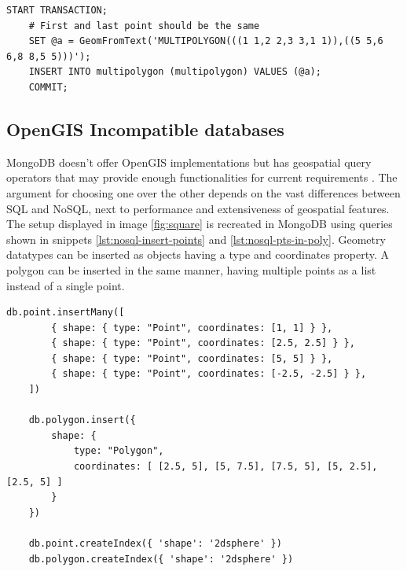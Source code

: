 \begin{center}
\noindent\begin{minipage}{.85\textwidth}
\begin{lstlisting}[caption={Insert one multipolygon in MySQL.}, label={lst:sql-multipolygon}]
	START TRANSACTION;
	# First and last point should be the same
	SET @a = GeomFromText('MULTIPOLYGON(((1 1,2 2,3 3,1 1)),((5 5,6 6,8 8,5 5)))');
	INSERT INTO multipolygon (multipolygon) VALUES (@a);
	COMMIT;
\end{lstlisting}
\end{minipage}
\end{center}

\subsection{OpenGIS Incompatible databases}
MongoDB doesn’t offer OpenGIS implementations but has geospatial query operators that may provide enough functionalities for current requirements \cite{MongoDB}. The argument for choosing one over the other depends on the vast differences between SQL and NoSQL, next to performance and extensiveness of geospatial features. The setup displayed in image \ref{fig:square} is recreated in MongoDB using queries shown in snippets \ref{lst:nosql-insert-points} and \ref{lst:nosql-pts-in-poly}. Geometry datatypes can be inserted as objects having a type and coordinates property. A polygon can be inserted in the same manner, having multiple points as a list instead of a single point.

\begin{center}
\noindent\begin{minipage}{.85\textwidth}
\begin{lstlisting}[caption={Insert four points and one polygon in MongoDB.}, label={lst:nosql-insert-points}]
	db.point.insertMany([
		{ shape: { type: "Point", coordinates: [1, 1] } },
		{ shape: { type: "Point", coordinates: [2.5, 2.5] } },
		{ shape: { type: "Point", coordinates: [5, 5] } },
		{ shape: { type: "Point", coordinates: [-2.5, -2.5] } },
	])

	db.polygon.insert({
		shape: {
			type: "Polygon",
			coordinates: [ [2.5, 5], [5, 7.5], [7.5, 5], [5, 2.5], [2.5, 5] ]
		}
	})

	db.point.createIndex({ 'shape': '2dsphere' })
	db.polygon.createIndex({ 'shape': '2dsphere' })
\end{lstlisting}
\end{minipage}
\end{center}

